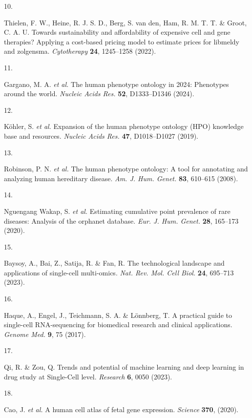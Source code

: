 \documentclass[
]{article}
\newlength{\cslhangindent}
\newlength{\csllabelwidth}
\newenvironment{CSLReferences}[2] %
 {\begin{list}{}{%
  \setlength{\itemindent}{0pt}
  \setlength{\leftmargin}{0pt}
  \setlength{\parsep}{0pt}
  \ifodd #1
   \setlength{\leftmargin}{\cslhangindent}
   \setlength{\itemindent}{-1\cslhangindent}
  \fi
  \setlength{\itemsep}{#2\baselineskip}}}
 {\end{list}}
\newcommand{\CSLLeftMargin}[1]{\parbox[t]{\csllabelwidth}{\strut#1\strut}}
\newcommand{\CSLRightInline}[1]{\parbox[t]{\linewidth - \csllabelwidth}{\strut#1\strut}}
\begin{document}
\begin{CSLReferences}{0}{0}
\CSLLeftMargin{10. }%
\CSLRightInline{Thielen, F. W., Heine, R. J. S. D., Berg, S. van den,
Ham, R. M. T. T. \& Groot, C. A. U. Towards sustainability and
affordability of expensive cell and gene therapies? Applying a
cost-based pricing model to estimate prices for libmeldy and zolgensma.
\emph{Cytotherapy} \textbf{24}, 1245--1258 (2022).}

\CSLLeftMargin{11. }%
\CSLRightInline{Gargano, M. A. \emph{et al.} The human phenotype
ontology in 2024: Phenotypes around the world. \emph{Nucleic Acids Res.}
\textbf{52}, D1333--D1346 (2024).}

\CSLLeftMargin{12. }%
\CSLRightInline{Köhler, S. \emph{et al.} Expansion of the human
phenotype ontology ({HPO}) knowledge base and resources. \emph{Nucleic
Acids Res.} \textbf{47}, D1018--D1027 (2019).}

\CSLLeftMargin{13. }%
\CSLRightInline{Robinson, P. N. \emph{et al.} The human phenotype
ontology: A tool for annotating and analyzing human hereditary disease.
\emph{Am. J. Hum. Genet.} \textbf{83}, 610--615 (2008).}

\CSLLeftMargin{14. }%
\CSLRightInline{Nguengang Wakap, S. \emph{et al.} Estimating cumulative
point prevalence of rare diseases: Analysis of the orphanet database.
\emph{Eur. J. Hum. Genet.} \textbf{28}, 165--173 (2020).}

\CSLLeftMargin{15. }%
\CSLRightInline{Baysoy, A., Bai, Z., Satija, R. \& Fan, R. The
technological landscape and applications of single-cell multi-omics.
\emph{Nat. Rev. Mol. Cell Biol.} \textbf{24}, 695--713 (2023).}

\CSLLeftMargin{16. }%
\CSLRightInline{Haque, A., Engel, J., Teichmann, S. A. \& Lönnberg, T. A
practical guide to single-cell {RNA-sequencing} for biomedical research
and clinical applications. \emph{Genome Med.} \textbf{9}, 75 (2017).}

\CSLLeftMargin{17. }%
\CSLRightInline{Qi, R. \& Zou, Q. Trends and potential of machine
learning and deep learning in drug study at {Single-Cell} level.
\emph{Research} \textbf{6}, 0050 (2023).}

\CSLLeftMargin{18. }%
\CSLRightInline{Cao, J. \emph{et al.} A human cell atlas of fetal gene
expression. \emph{Science} \textbf{370}, (2020).}


\end{CSLReferences}
\end{document}
